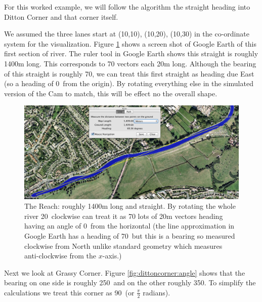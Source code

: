       For this worked example, we will follow the algorithm the straight heading into Ditton Corner and that corner itself.
      
      We assumed the three lanes start at (10,10), (10,20), (10,30) in the co-ordinate system for the visualization. Figure \ref{fig:thereach} shows a  screen shot of Google Earth of this first section of river. The ruler tool in Google Earth shows this straight is roughly 1400m long. This corresponds to 70 vectors each 20m long. Although the bearing of this straight is roughly 70\textdegree, we can treat this first straight as heading due East (so a heading of 0\textdegree\ from the origin). By rotating everything else in the simulated version of the Cam to match, this will be effect no the overall shape.
      
      \begin{figure}
      \begin{center}
        \includegraphics[scale=0.4]{images/TheReach.png}
        \caption{The Reach: roughly 1400m long and straight. By rotating the whole river 20\textdegree \ clockwise can treat it as 70 lots of 20m vectors heading having an angle of 0\textdegree \ from the horizontal (the line approximation in Google Earth has a heading of 70\textdegree\ but this is a bearing so measured clockwise from North unlike standard geometry which measures anti-clockwise from the $x$-axis.)}
        \label{fig:thereach}
      \end{center}
      \end{figure}
      
      Next we look at Grassy Corner. Figure \ref{fig:dittoncorner:angle} shows that the bearing on one side is roughly 250\textdegree\  and on the other roughly 350\textdegree. To simplify the calculations we treat this corner as 90\textdegree\ (or $\frac{\pi}{2}$ radians).
      
